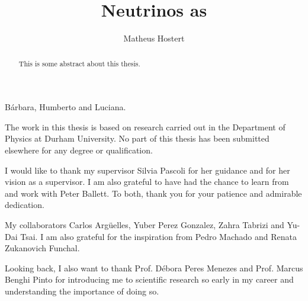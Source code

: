 \documentclass[openany,twoside,frontopenright,chaprunninghead]{ip3thesis}
\begin{document}
\title{Neutrinos as }
\subtitle{}
\author{Matheus Hostert}
\maketitlepage*

\begin{abstract}
%
	This is some abstract about this thesis.
%
\end{abstract}


\begin{dedication*}
%
B\'arbara, Humberto and Luciana.
%
\end{dedication*}

\disableprotrusion
\tableofcontents*
\listoffigures
\listoftables
\enableprotrusion

\begin{declaration*}
%
	The work in this thesis is based on research carried out in the Department of
	Physics at Durham University. No part of this thesis has been
	submitted elsewhere for any degree or qualification.
%
\end{declaration*}

\begin{acknowledgements*}

	I would like to thank my supervisor Silvia Pascoli for her guidance and for her vision as a supervisor. I am also grateful to have had the chance to learn from and work with Peter Ballett. To both, thank you for your patience and admirable dedication.

	My collaborators Carlos Arg\"uelles, Yuber Perez Gonzalez, Zahra Tabrizi and Yu-Dai Tsai. I am also grateful for the inspiration from Pedro Machado and Renata Zukanovich Funchal.

	
	Looking back, I also want to thank Prof. D\'ebora Peres Menezes and Prof. Marcus Benghi Pinto for introducing me to scientific research so early in my career and understanding the importance of doing so. 
	
\end{acknowledgements*}



\cleardoublepage

\begin{epigraph*}
% 
% 
\end{epigraph*} 
\end{document}
